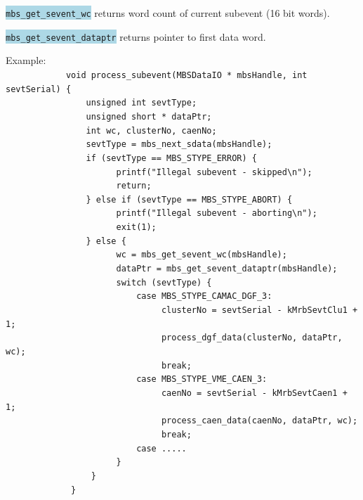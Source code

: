 \documentclass[10pt,a4paper]{article}
\newcommand{\blue}[1]{\colorbox{lightblue}{\texttt{#1}}}
\newenvironment{yellowboxed}
	{\begin{Sbox}\begin{minipage}[t]}
	{\end{minipage}\end{Sbox}\colorbox{yellow}{\TheSbox}}
\begin{document}
\blue{mbs\_get\_sevent\_wc} returns word count of current subevent (16 bit words).

\blue{mbs\_get\_sevent\_dataptr} returns pointer to first data word.
\vspace{5mm}

\begin{yellowboxed}{\linewidth}
Example:\\
\verb+            void process_subevent(MBSDataIO * mbsHandle, int sevtSerial) {+\\
\verb+                unsigned int sevtType;+\\
\verb+                unsigned short * dataPtr;+\\
\verb+                int wc, clusterNo, caenNo;+\\
\verb+                sevtType = mbs_next_sdata(mbsHandle);+\\
\verb+                if (sevtType == MBS_STYPE_ERROR) {+\\
\verb+                      printf("Illegal subevent - skipped\n");+\\
\verb+                      return;+\\
\verb+                } else if (sevtType == MBS_STYPE_ABORT) {+\\
\verb+                      printf("Illegal subevent - aborting\n");+\\
\verb+                      exit(1);+\\
\verb+                } else {+\\
\verb+                      wc = mbs_get_sevent_wc(mbsHandle);+\\
\verb+                      dataPtr = mbs_get_sevent_dataptr(mbsHandle);+\\
\verb+                      switch (sevtType) {+\\
\verb+                          case MBS_STYPE_CAMAC_DGF_3:+\\
\verb.                               clusterNo = sevtSerial - kMrbSevtClu1 + 1;.\\
\verb+                               process_dgf_data(clusterNo, dataPtr, wc);+\\
\verb+                               break;+\\
\verb+                          case MBS_STYPE_VME_CAEN_3:+\\
\verb.                               caenNo = sevtSerial - kMrbSevtCaen1 + 1;.\\
\verb+                               process_caen_data(caenNo, dataPtr, wc);+\\
\verb+                               break;+\\
\verb+                          case .....+\\
\verb+                      }+\\
\verb+                 }+\\
\verb+             }+
\end{yellowboxed}
\vspace{5mm}
\end{document}
